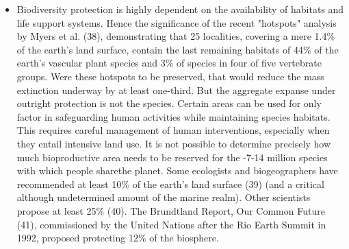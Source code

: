 \documentclass[twoside]{article}	%
\begin{document}
\begin{itemize}
  \item Biodiversity protection is highly dependent on the availability of habitats and life support systems. Hence the significance of the recent "hotspots" analysis by Myers et al. (38), demonstrating that 25 localities, covering a mere 1.4\% of the earth's land surface, contain the last remaining habitats of 44\% of the earth's vascular plant species and 3\% of species in four of five vertebrate groups. Were these hotspots to be preserved, that would reduce the mass extinction underway by at least one-third. But the aggregate expanse under outright protection is not the species. Certain areas can be used for only factor in safeguarding human activities while maintaining species habitats. This requires careful management of human interventions, especially when they entail intensive land use. It is not possible to determine precisely how much bioproductive area needs to be reserved for the -7-14 million species with which people sharethe planet. Some ecologists and biogeographers have recommended at least 10\% of the earth's land surface (39) (and a critical although undetermined amount of the marine realm). Other scientists propose at least 25\% (40). The Brundtland Report, Our Common Future (41), commissioned by the United Nations after the Rio Earth Summit in 1992, proposed protecting 12\% of the biosphere.
\end{itemize}
\end{document}
